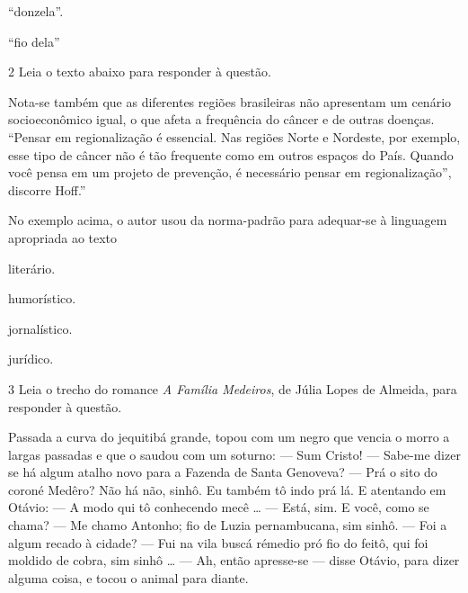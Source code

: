 {\begin{escolha}
  \item ``donzela''.
  
  \item ``fio dela''

\end{escolha}


\num{2} Leia o texto abaixo para responder à questão.

\begin{myquote}
Nota-se também que as diferentes regiões brasileiras não apresentam um
cenário socioeconômico igual, o que afeta a frequência do câncer e de
outras doenças. ``Pensar em regionalização é essencial. Nas regiões Norte
e Nordeste, por exemplo, esse tipo de câncer não é tão frequente como em
outros espaços do País. Quando você pensa em um projeto de prevenção, é
necessário pensar em regionalização'', discorre Hoff.''
\end{myquote}


No exemplo acima, o autor usou da norma-padrão para adequar-se à linguagem apropriada ao texto

\begin{escolha}
  
  \item literário.
  
  \item humorístico.
  
  \item jornalístico.
  
  \item jurídico.

\end{escolha}

\num{3} Leia o trecho do romance \textit{A Família Medeiros}, de Júlia Lopes de Almeida, para 
responder à questão. 

\begin{myquote}

Passada a curva do jequitibá grande, topou com um negro
que vencia o morro a largas passadas e que o saudou com um
soturno:
--- Sum Cristo!
--- Sabe-me dizer se há algum atalho novo para a Fazenda de
Santa Genoveva?
--- Prá o sito do coroné Medêro? Não há não, sinhô. Eu
também tô indo prá lá.
E atentando em Otávio:
--- A modo qui tô conhecendo mecê \ldots{}
--- Está, sim. E você, como se chama?
--- Me chamo Antonho; fio de Luzia pernambucana, sim sinhô.
--- Foi a algum recado à cidade?
--- Fui na vila buscá rémedio pró fio do feitô, qui foi moldido
de cobra, sim sinhô \ldots{}
--- Ah, então apresse-se --- disse Otávio, para dizer alguma
coisa, e tocou o animal para diante.
\end{myquote}


}
